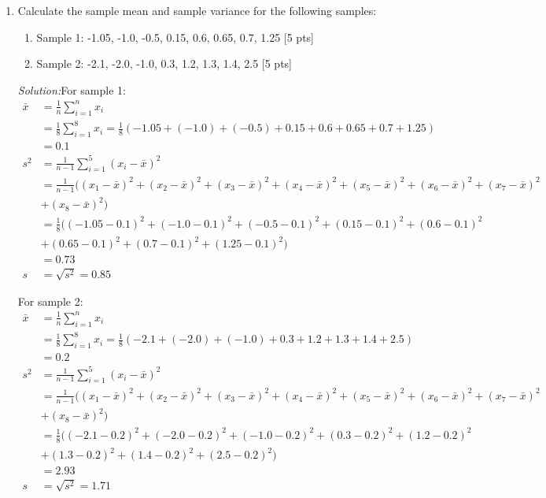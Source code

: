 \documentclass[11pt]{article}\usepackage[]{graphicx}\usepackage[]{color}
\begin{document}
\begin{enumerate}
\item Calculate the sample mean and sample variance for the following samples:
\begin{enumerate}
	\item Sample 1: -1.05, -1.0, -0.5, 0.15, 0.6, 0.65, 0.7, 1.25 [5 pts]
	\item Sample 2: -2.1, -2.0, -1.0, 0.3, 1.2, 1.3, 1.4, 2.5 [5 pts]
\end{enumerate}
\emph{Solution:}For sample 1:
    \begin{align*}
    	\bar{x} &= \frac{1}{n}\sum_{i=1}^{n}x_i\\
    			&= \frac{1}{8}\sum_{i=1}^{8}x_i= \frac{1}{8} (-1.05 + (-1.0)+ (-0.5) + 0.15 + 0.6 + 0.65+ 0.7+ 1.25) \\
    			&= 0.1\\
    	s^2 &= \frac{1}{n-1}\sum_{i=1}^5 (x_i - \bar{x})^2 \\
    		&= \frac{1}{n-1}( (x_1 - \bar{x})^2 + (x_2 - \bar{x})^2 + (x_3 - \bar{x})^2 + (x_4 - \bar{x})^2 + (x_5 - \bar{x})^2+ (x_6 - \bar{x})^2+ (x_7 - \bar{x})^2\\
    		&+ (x_8 - \bar{x})^2  )\\
    		&= \frac{1}{8}( (-1.05 -0.1)^2 + (-1.0 - 0.1)^2+ (-0.5 - 0.1)^2+ (0.15 - 0.1)^2+ (0.6 - 0.1)^2\\
    		&+ (0.65 - 0.1)^2+ (0.7 - 0.1)^2+ (1.25 - 0.1)^2  )\\
    		&= 0.73\\
    	s&= \sqrt{s^2}= 0.85
    \end{align*}

For sample 2:
    \begin{align*}
    	\bar{x} &= \frac{1}{n}\sum_{i=1}^{n}x_i\\
    	&= \frac{1}{8}\sum_{i=1}^{8}x_i= \frac{1}{8} (-2.1+ (-2.0)+ (-1.0)+ 0.3+ 1.2+ 1.3+ 1.4+ 2.5) \\
    	&= 0.2\\
    	s^2 &= \frac{1}{n-1}\sum_{i=1}^5 (x_i - \bar{x})^2 \\
    	&= \frac{1}{n-1}( (x_1 - \bar{x})^2 + (x_2 - \bar{x})^2 + (x_3 - \bar{x})^2 + (x_4 - \bar{x})^2 + (x_5 - \bar{x})^2+ (x_6 - \bar{x})^2+ (x_7 - \bar{x})^2\\
    	&+ (x_8 - \bar{x})^2  )\\
    	&= \frac{1}{8}( (-2.1 -0.2)^2 + ( -2.0 - 0.2)^2+ (-1.0 - 0.2)^2+ (0.3 - 0.2)^2+ (1.2 - 0.2)^2\\
    	&+ (1.3 - 0.2)^2+ (1.4 - 0.2)^2+ (2.5 - 0.2)^2  )\\
    	&= 2.93\\
    	s&= \sqrt{s^2}= 1.71
    \end{align*}


\end{enumerate}
\end{document}
